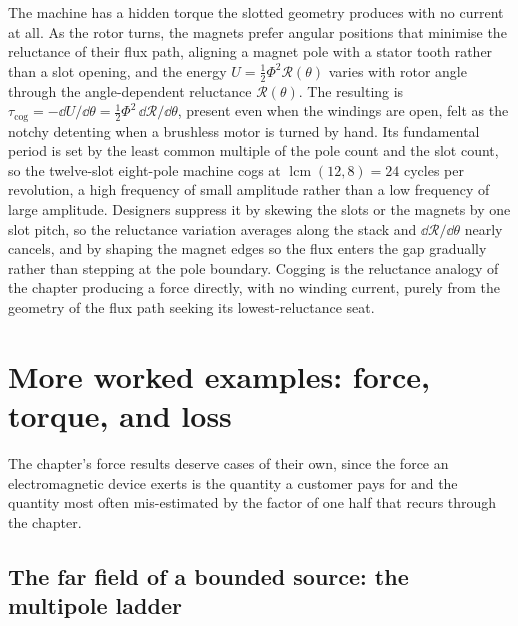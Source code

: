 \begin{mastery}
The machine has a hidden torque the slotted geometry produces with no
current at all. As the rotor turns, the magnets prefer angular positions
that minimise the reluctance of their flux path, aligning a magnet pole
with a stator tooth rather than a slot opening, and the energy
$U = \tfrac12\Phi^{2}\mathcal{R}(\theta)$ varies with rotor angle through
the angle-dependent reluctance $\mathcal{R}(\theta)$. The resulting
 is $\tau_{\text{cog}} = -\dd U/\dd\theta =
\tfrac12\Phi^{2}\,\dd\mathcal{R}/\dd\theta$, present even when the windings
are open, felt as the notchy detenting when a brushless motor is turned by
hand. Its fundamental period is set by the least common multiple of the
pole count and the slot count, so the twelve-slot eight-pole machine
cogs at $\operatorname{lcm}(12,8) = 24$ cycles per revolution, a high
frequency of small amplitude rather than a low frequency of large
amplitude. Designers suppress it by skewing the slots or the magnets by
one slot pitch, so the reluctance variation averages along the stack and
$\dd\mathcal{R}/\dd\theta$ nearly cancels, and by shaping the magnet edges
so the flux enters the gap gradually rather than stepping at the pole
boundary. Cogging is the reluctance analogy of the chapter producing a
force directly, with no winding current, purely from the geometry of the
flux path seeking its lowest-reluctance seat.
\end{mastery}

\section{More worked examples: force, torque, and loss}

The chapter's force results deserve cases of their own, since the force
an electromagnetic device exerts is the quantity a customer pays for and
the quantity most often mis-estimated by the factor of one half that
recurs through the chapter.

\subsection{The far field of a bounded source: the multipole ladder}

